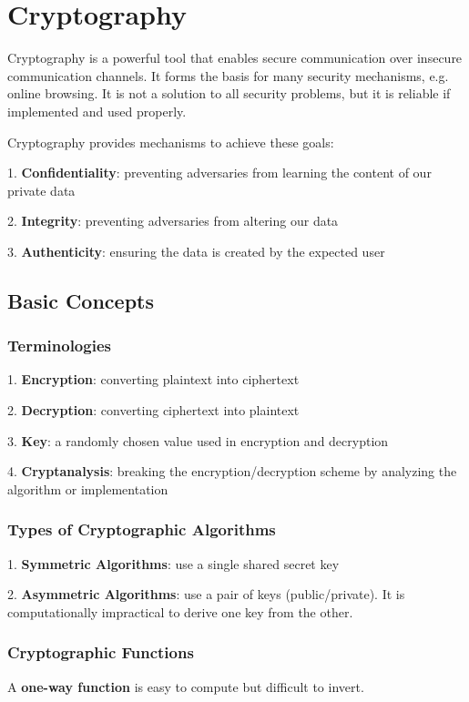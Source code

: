 \chapter{Cryptography}

Cryptography is a powerful tool that enables secure communication over insecure communication channels. It forms the basis for many security mechanisms, e.g. online browsing. It is not a solution to all security problems, but it is reliable if implemented and used properly.

Cryptography provides mechanisms to achieve these goals:

1. \textbf{Confidentiality}: preventing adversaries from learning the content of our private data

2. \textbf{Integrity}: preventing adversaries from altering our data

3. \textbf{Authenticity}: ensuring the data is created by the expected user

\section{Basic Concepts}

\subsection{Terminologies}
1. \textbf{Encryption}: converting plaintext into ciphertext

2. \textbf{Decryption}: converting ciphertext into plaintext

3. \textbf{Key}: a randomly chosen value used in encryption and decryption

4. \textbf{Cryptanalysis}: breaking the encryption/decryption scheme by analyzing the algorithm or implementation

\subsection{Types of Cryptographic Algorithms}
1. \textbf{Symmetric Algorithms}: use a single shared secret key

2. \textbf{Asymmetric Algorithms}: use a pair of keys (public/private). It is computationally impractical to derive one key from the other.

\subsection{Cryptographic Functions}
A \textbf{one-way function} is easy to compute but difficult to invert.

